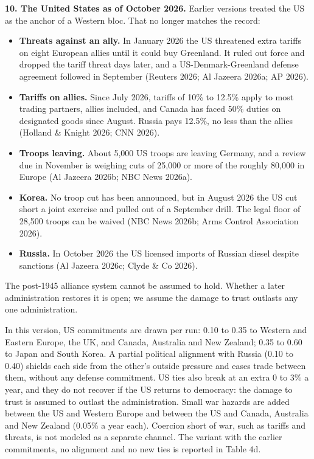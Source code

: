 \documentclass[
  10pt,
]{article}
\providecommand{\tightlist}{%
  \setlength{\itemsep}{0pt}\setlength{\parskip}{0pt}}
\begin{document}
\textbf{10. The United States as of October 2026.} Earlier versions treated the US as the anchor of
a Western bloc. That no longer matches the record:

\begin{itemize}
\tightlist
\item
  \textbf{Threats against an ally.} In January 2026 the US threatened extra tariffs on eight
  European allies until it could buy Greenland. It ruled out force and dropped the tariff threat
  days later, and a US-Denmark-Greenland defense agreement followed in September (Reuters 2026; Al
  Jazeera 2026a; AP 2026).
\item
  \textbf{Tariffs on allies.} Since July 2026, tariffs of 10\% to 12.5\% apply to most trading
  partners, allies included, and Canada has faced 50\% duties on designated goods since August.
  Russia pays 12.5\%, no less than the allies (Holland \& Knight 2026; CNN 2026).
\item
  \textbf{Troops leaving.} About 5,000 US troops are leaving Germany, and a review due in November
  is weighing cuts of 25,000 or more of the roughly 80,000 in Europe (Al Jazeera 2026b; NBC News
  2026a).
\item
  \textbf{Korea.} No troop cut has been announced, but in August 2026 the US cut short a joint
  exercise and pulled out of a September drill. The legal floor of 28,500 troops can be waived (NBC
  News 2026b; Arms Control Association 2026).
\item
  \textbf{Russia.} In October 2026 the US licensed imports of Russian diesel despite sanctions (Al
  Jazeera 2026c; Clyde \& Co 2026).
\end{itemize}

The post-1945 alliance system cannot be assumed to hold. Whether a later administration restores it
is open; we assume the damage to trust outlasts any one administration.

In this version, US commitments are drawn per run: 0.10 to 0.35 to Western and Eastern Europe, the
UK, and Canada, Australia and New Zealand; 0.35 to 0.60 to Japan and South Korea. A partial
political alignment with Russia (0.10 to 0.40) shields each side from the other's outside pressure
and eases trade between them, without any defense commitment. US ties also break at an extra 0 to
3\% a year, and they do not recover if the US returns to democracy: the damage to trust is assumed
to outlast the administration. Small war hazards are added between the US and Western Europe and
between the US and Canada, Australia and New Zealand (0.05\% a year each). Coercion short of war,
such as tariffs and threats, is not modeled as a separate channel. The variant with the earlier
commitments, no alignment and no new ties is reported in Table 4d.
\end{document}
